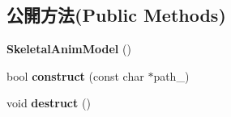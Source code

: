 \subsection*{公開方法(Public Methods)}
\begin{DoxyCompactItemize}
\item 
{\bfseries Skeletal\+Anim\+Model} ()\hypertarget{class_magnum_1_1endif_a84c44781c138ed94306c240b756a620e}{}\label{class_magnum_1_1endif_a84c44781c138ed94306c240b756a620e}

\item 
bool {\bfseries construct} (const char $\ast$path\+\_\+)\hypertarget{class_magnum_1_1endif_a55bb108c0e96c3ff0521d5d9397af62a}{}\label{class_magnum_1_1endif_a55bb108c0e96c3ff0521d5d9397af62a}

\item 
void {\bfseries destruct} ()\hypertarget{class_magnum_1_1endif_a512f42984fb78dbab327715d1e67bf3e}{}\label{class_magnum_1_1endif_a512f42984fb78dbab327715d1e67bf3e}


\end{DoxyCompactItemize}
